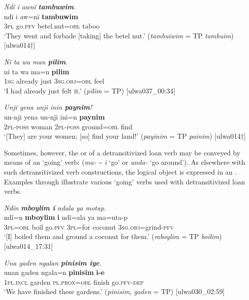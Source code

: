 \ea%
    \label{ex:loss:18}
          \textit{Ndï i awnï \textbf{tambuwim}.}\\
\gll ndï    i    aw=nï      \textbf{tambuwim}\\
    3\textsc{pl}    go.\textsc{pfv}  betel.nut=\textsc{obl}  taboo\\
\glt `They went and forbade [taking] the betel nut.’ (\textit{tambuiwim} = TP \textit{tambuim}) [ulwa014†]
\z

\ea%
    \label{ex:loss:19}
          \textit{Nï ta wa man \textbf{pilim}.}\\
\gll nï    ta      wa  ma=n      \textbf{pilim}\\
    1\textsc{sg}  already    just  3\textsc{sg.obj=obl}  feel\\
\glt `I had already just felt it.’ (\textit{pilim} = TP) [ulwa037\_00:34]
\z

\ea%
    \label{ex:loss:20}
          \textit{Unji yena unji inin \textbf{paynim}!}\\
\gll    un-nji    yena    un-nji    ini=n      \textbf{paynim}\\
    \textsc{2pl-poss}  woman    \textsc{2pl-poss}  ground=\textsc{obl}  find\\
\glt `[They] are your women; [so] find your land!’ (\textit{payinim} = TP \textit{painim}) [ulwa014†]
\z

Sometimes, however, the  or  of a detransitivized  loan verb may be conveyed by means of an  ‘going’ verb: (\textit{ma-} {\textasciitilde} \textit{i} ‘go’ or \textit{unda-} ‘go around’). As elsewhere with such detransitivized verb constructions, the logical object is expressed in an  . Examples  through  illustrate various ‘going’ verbs used with detransitivized  loan verbs.

\ea%
    \label{ex:loss:22}
          \textit{Ndïn \textbf{mboylim i} ndala ya motap.}\\
\gll    ndï=n    \textbf{mboylim}  \textbf{i}    ndï=ala  ya ma=uta-p\\
    3\textsc{pl=obl}  boil    go.\textsc{pfv}  3\textsc{pl}=for  coconut    3\textsc{sg.obj}=grind-\textsc{pfv}\\
\glt `[I] boiled them and ground a coconut for them.’ (\textit{mboylim} = TP \textit{boilim}) [ulwa014\_17:31]
\z

\ea%
    \label{ex:loss:23}
          \textit{Una gaden ngalan \textbf{pinisim iye}.}\\
\gll unan    gaden  ngala=n    \textbf{pinisim}  \textbf{i-e}\\
    1\textsc{pl.incl}  garden  \textsc{pl.prox=obl}  finish    go.\textsc{pfv-dep}\\
\glt `We have finished these gardens.’ (\textit{pinisim}, \textit{gaden} = TP) [ulwa030\_02:59]
\z


